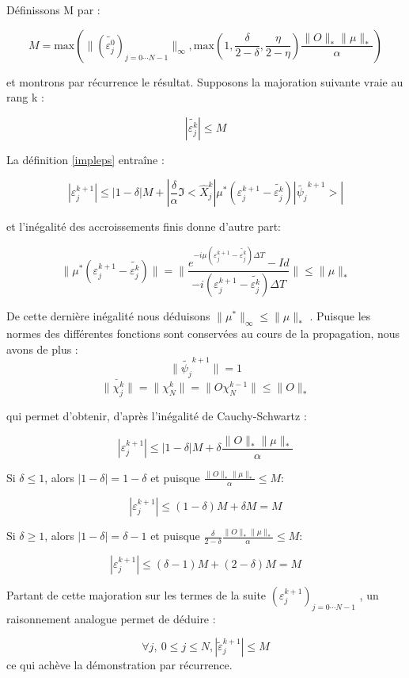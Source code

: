 \begin{ proof }
	Définissons M par :
	
	\begin{equation} \label{M}
	M = \text{max}(\lVert (\tilde{\varepsilon^0_j})_{j=0\cdots N-1}\lVert_{\infty}, \text{max}(1,\frac{\delta}{2-\delta}, \frac{\eta}{2-\eta})\frac{\lVert O \rVert_* \lVert \mu \rVert_* }{\alpha} )
	\end{equation}
	
	et montrons par récurrence le résultat. Supposons la majoration suivante vraie au rang k :
	
	$$ |\tilde{\varepsilon^k_j}| \leq M $$
	
	La définition \eqref{impleps} entraîne :
	
	$$ |\varepsilon_j^{k+1}| \leq |1-\delta|M + |\frac{\delta}{\alpha} \Im < \hat{X}^k_j| \mu^* ( \varepsilon_j^{k+1} - \tilde{\varepsilon^k_j})| \tilde{\psi_j}^{k+1} >|  $$
	
	et l'inégalité des accroissements finis donne d’autre part:
	
	$$ \lVert \mu^* ( \varepsilon_j^{k+1} - \tilde{\varepsilon^k_j}) \rVert = \lVert \frac{e^{-i \mu( \varepsilon_j^{k+1} - \tilde{\varepsilon^k_j})\Delta T}-Id}{-i ( \varepsilon_j^{k+1} - \tilde{\varepsilon^k_j})\Delta T} \rVert \leq \lVert \mu \rVert_*  $$
	
	De cette dernière inégalité nous déduisons $ \lVert \mu^* \rVert_{\infty} \leq  \lVert \mu \rVert_*  $ . Puisque les normes des différentes fonctions sont conservées au cours de la propagation, nous avons de plus :
	$$ \lVert \tilde{\psi_j}^{k+1} \rVert = 1  $$
	$$ \lVert \breve{\chi^k_j} \rVert = \lVert \chi^k_N \rVert = \lVert O \chi_N^{k-1}\rVert \leq \lVert O \rVert_* $$
	
	qui permet d'obtenir, d’après l'inégalité de Cauchy-Schwartz :
	
	$$ |\varepsilon_j^{k+1} | \leq |1-\delta|M + \delta \frac{\lVert O \rVert_* \lVert \mu \rVert_* }{\alpha} $$
	
	Si $\delta \leq 1$, alors $|1-\delta| = 1-\delta$ et puisque $\frac{\lVert O \rVert_* \lVert \mu \rVert_* }{\alpha} \leq M$:
	
	$$ |\varepsilon_j^{k+1} | \leq (1-\delta)M + \delta M = M $$
	
	Si $\delta \geq 1$, alors $|1-\delta| = \delta - 1$ et puisque $\frac{\delta}{2-\delta} \frac{\lVert O \rVert_* \lVert \mu \rVert_* }{\alpha} \leq M$:
	
	$$ |\varepsilon_j^{k+1} | \leq (\delta-1)M + (2-\delta) M = M $$
	
	Partant de cette majoration sur les termes de la suite $ (\varepsilon_j^{k+1})_{j=0\cdots N-1} $ , un raisonnement analogue permet de déduire :
	
	$$ \forall j,\ 0 \leq j \leq N, |\tilde{\varepsilon}_j^{k+1} | \leq M $$
	ce qui achève la démonstration par récurrence.
\end{ proof }

